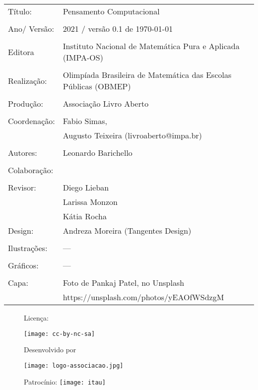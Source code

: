 \begin{tabular}{p{}p{}}
Título: & Pensamento Computacional\\
\\
Ano/ Versão: & 2021 / versão 0.1 de \today\\
\\
Editora & Instituto Nacional de Matem\'atica Pura e Aplicada (IMPA-OS)\\
\\
Realização:& Olimp\'iada Brasileira de Matem\'atica das Escolas P\'ublicas (OBMEP)\\
\\
Produção:& Associação Livro Aberto\\
\\
Coordenação: & Fabio Simas, \\
			&  Augusto Teixeira (livroaberto@impa.br)\\
\\
  Autores: & Leonardo Barichello\\
\\
Colaboração: & \\
\\
Revisor: & Diego Lieban \\
		 & Larissa Monzon \\
		 & Kátia Rocha
\\
Design: & Andreza Moreira (Tangentes Design) \\
\\
  Ilustrações: & --- \\ 
\\
Gráficos: & ---\\
\\
  Capa: & Foto de Pankaj Patel, no Unsplash \\
  		& https://unsplash.com/photos/yEAOfWSdzgM \\

\end{tabular}
\vspace{.5cm}



\begin{figure}[b]
\begin{minipage}[l]{5cm}
\centering

{\large Licença:}

  \texttt{[image: cc-by-nc-sa]}
\end{minipage}\hfill
\begin{minipage}[c]{5cm}
\centering
{\large Desenvolvido por}

\texttt{[image: logo-associacao.jpg]}
\end{minipage}
\begin{minipage}[r]{5cm}
\centering

{\large Patrocínio:}
  \vspace{1em}
  \texttt{[image: itau]}
\end{minipage}
\end{figure}

